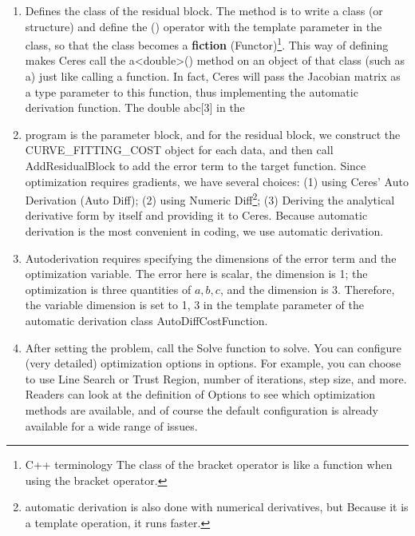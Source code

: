 \begin{enumerate}
\item Defines the class of the residual block. The method is to write a class (or structure) and define the () operator with the template parameter in the class, so that the class becomes a \textbf{fiction} (Functor)\footnote{C++ terminology The class of the bracket operator is like a function when using the bracket operator. }. This way of defining makes Ceres call the a<double>() method on an object of that class (such as a) just like calling a function. In fact, Ceres will pass the Jacobian matrix as a type parameter to this function, thus implementing the automatic derivation function.
The double abc[3] in the \item program is the parameter block, and for the residual block, we construct the CURVE\_FITTING\_COST object for each data, and then call AddResidualBlock to add the error term to the target function. Since optimization requires gradients, we have several choices: (1) using Ceres' Auto Derivation (Auto Diff); (2) using Numeric Diff\footnote{automatic derivation is also done with numerical derivatives, but Because it is a template operation, it runs faster. }; (3) Deriving the analytical derivative form by itself and providing it to Ceres. Because automatic derivation is the most convenient in coding, we use automatic derivation.
\item Autoderivation requires specifying the dimensions of the error term and the optimization variable. The error here is scalar, the dimension is 1; the optimization is three quantities of $a, b, c$, and the dimension is 3. Therefore, the variable dimension is set to 1, 3 in the template parameter of the automatic derivation class AutoDiffCostFunction.
\item After setting the problem, call the Solve function to solve. You can configure (very detailed) optimization options in options. For example, you can choose to use Line Search or Trust Region, number of iterations, step size, and more. Readers can look at the definition of Options to see which optimization methods are available, and of course the default configuration is already available for a wide range of issues.
\end{enumerate}


